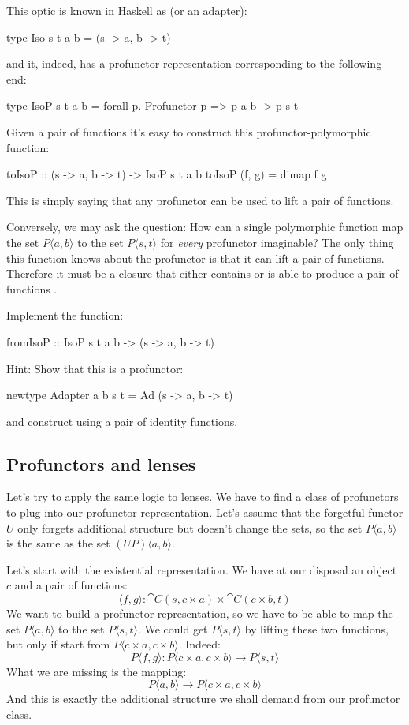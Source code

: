 \documentclass[DaoFP]{subfiles}
\begin{document}
This optic is known in Haskell as  (or an adapter):
\begin{haskell}
type Iso s t a b = (s -> a, b -> t)
\end{haskell}
and it, indeed, has a profunctor representation corresponding to the following end:
\begin{haskell}
type IsoP s t a b = forall p. Profunctor p => p a b -> p s t
\end{haskell}

Given a pair of functions it's easy to construct this profunctor-polymorphic function:
\begin{haskell}
toIsoP :: (s -> a, b -> t) -> IsoP s t a b
toIsoP (f, g) = dimap f g
\end{haskell}
This is simply saying that any profunctor can be used to lift a pair of functions. 

Conversely, we may ask the question: How can a single polymorphic function map the set $P \langle a, b \rangle$ to the set $P \langle s, t \rangle$ for \emph{every} profunctor imaginable? The only thing this function knows about the profunctor is that it can lift a pair of functions. Therefore it must be a closure that either contains or is able to produce a pair of functions . 

\begin{exercise}
Implement the function:
\begin{haskell}
fromIsoP :: IsoP s t a b -> (s -> a, b -> t)
\end{haskell}
Hint: Show that this is a profunctor:
\begin{haskell}
newtype Adapter a b s t = Ad (s -> a, b -> t)
\end{haskell}
and construct  using a pair of identity functions.
\end{exercise}

\subsection{Profunctors and lenses}

Let's try to apply the same logic to lenses. We have to find a class of profunctors to plug into our profunctor representation. Let's assume that the forgetful functor $U$ only forgets additional structure but doesn't change the sets, so the set $P \langle a, b \rangle$ is the same as the set $(U P) \langle a, b \rangle$. 

Let's start with the existential representation. We have at our disposal an object $c$ and a pair of functions:
\[  \langle f, g \rangle \colon \cat C(s, c \times a) \times \cat C(c \times b, t) \]
We want to build a profunctor representation, so we have to be able to map the set $P \langle a, b \rangle$ to the set $P \langle s, t \rangle$. We could get $P \langle s, t \rangle$ by lifting these two functions, but only if start from $P \langle c \times a, c \times b \rangle$. Indeed:
\[ P \langle f, g \rangle \colon P \langle c \times a, c \times b \rangle \to P \langle s, t \rangle \]
What we are missing is the mapping:
\[ P \langle a, b \rangle \to P \langle c \times a, c \times b \rangle \]
And this is exactly the additional structure we shall demand from our profunctor class. 
\end{document}
